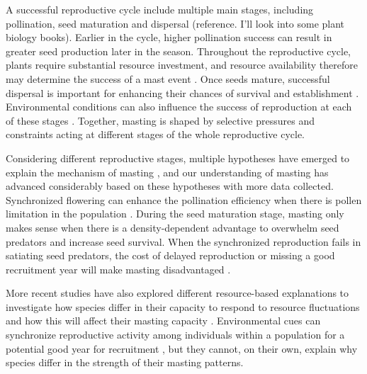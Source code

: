 \documentclass{article}
\begin{document}
A successful reproductive cycle include multiple main stages, including pollination, seed maturation and dispersal (reference. I'll look into some plant biology books). Earlier in the cycle, higher pollination success can result in greater seed production later in the season. Throughout the reproductive cycle, plants require substantial resource investment, and resource availability therefore may determine the success of a mast event \citep{crone2014resource}. Once seeds mature, successful dispersal is important for enhancing their chances of survival and establishment \citep{janzen1971seed, willson2000ecology}. Environmental conditions can also influence the success of reproduction at each of these stages \citep{bogdziewicz2017masting, grime2022evidence, bazzaz1997allocation, feurtado2017521}. Together, masting is shaped by selective pressures and constraints acting at different stages of the whole reproductive cycle.

Considering different reproductive stages, multiple hypotheses have emerged to explain the mechanism of masting \citep{pearse2016mechanisms, bogdziewicz2019environmental, bogdziewicz2018correlated}, and our understanding of masting has advanced considerably based on these hypotheses with more data collected. Synchronized flowering can enhance the pollination efficiency when there is pollen limitation in the population \citep{satake2000pollen, pearse2015pollen, bogdziewicz2017masting}. During the seed maturation stage, masting only makes sense when there is a density-dependent advantage to overwhelm seed predators and increase seed survival. When the synchronized reproduction fails in satiating seed predators, the cost of delayed reproduction or missing a good recruitment year will make masting disadvantaged \citep{silvertown1980evolutionary, qiu2023masting}. 

More recent studies have also explored different resource-based explanations to investigate how species differ in their capacity to respond to resource fluctuations and how this will affect their masting capacity \citep{journe2023evolution, fernandez2019nutrient}. Environmental cues can synchronize reproductive activity among individuals within a population for a potential good year for recruitment \citep{schauber2002masting, moreira2015effects}, but they cannot, on their own, explain why species differ in the strength of their masting patterns.
\end{document}
